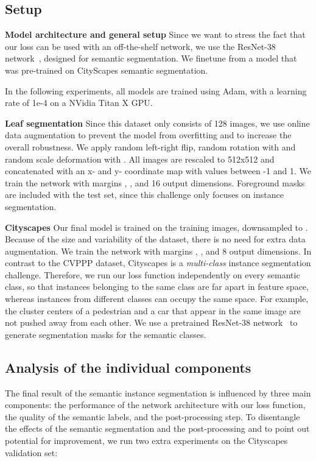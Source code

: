 \documentclass[10pt,twocolumn,letterpaper]{article}
\begin{document}
\subsection{Setup}

\textbf{Model architecture and general setup}
Since we want to stress the fact that our loss can be used with an off-the-shelf network, we use the ResNet-38 network~\cite{wu2016wider}, designed for semantic segmentation. We finetune from a model that was pre-trained on CityScapes semantic segmentation.

In the following experiments, all models are trained using Adam, with a learning rate of 1e-4 on a NVidia Titan X GPU. 

\textbf{Leaf segmentation}
Since this dataset only consists of 128 images, we use online data augmentation to prevent the model from overfitting and to increase the overall robustness. 
We apply random left-right flip, random rotation with  and random scale deformation with . All images are rescaled to 512x512 and concatenated with an x- and y- coordinate map with values between -1 and 1. We train the network with margins , , and 16 output dimensions.
Foreground masks are included with the test set, since this challenge only focuses on instance segmentation.

\textbf{Cityscapes}
Our final model is trained on the training images, downsampled to . 
Because of the size and variability of the dataset, there is no need for extra data augmentation.
We train the network with margins , , and 8 output dimensions.
In contrast to the CVPPP dataset, Cityscapes is a \textit{multi-class} instance segmentation challenge. 
Therefore, we run our loss function independently on every semantic class, so that instances belonging to the same class are far apart in feature space, whereas instances from different classes can occupy the same space. For example, the cluster centers of a pedestrian and a car that appear in the same image are not pushed away from each other. We use a pretrained ResNet-38 network~\cite{wu2016wider} to generate segmentation masks for the semantic classes.

\subsection{Analysis of the individual components}
\label{sec:invividualComponentAnalysis}
The final result of the semantic instance segmentation is influenced by three main components: the performance of the network architecture with our loss function, the quality of the semantic labels, and the post-processing step. To disentangle the effects of the semantic segmentation and the post-processing and to point out potential for improvement, we run two extra experiments on the Cityscapes validation set:
\end{document}
